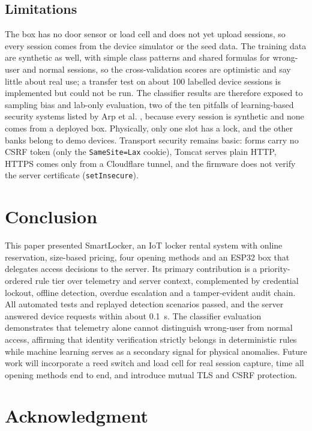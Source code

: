 \subsection{Limitations}
\label{sec:limits}

The box has no door sensor or load cell and does not yet upload sessions, so every session comes from the device
simulator or the seed data. The training data are synthetic as well, with simple class patterns and shared formulas
for wrong-user and normal sessions, so the cross-validation scores are optimistic and say little about real use; a
transfer test on about 100 labelled device sessions is implemented but could not be run. The classifier results are
therefore exposed to sampling bias and lab-only evaluation, two of the ten pitfalls of learning-based security systems
listed by Arp et al. \cite{arp2024pitfalls}, because every session is synthetic and none comes from a deployed box.
Physically, only one slot has
a lock, and the other banks belong to demo devices. Transport security remains basic: forms carry no CSRF token (only
the \texttt{SameSite=Lax} cookie), Tomcat serves plain HTTP, HTTPS comes only from a Cloudflare tunnel, and the
firmware does not verify the server certificate (\texttt{setInsecure}).

\section{Conclusion}


This paper presented SmartLocker, an IoT locker rental system with online reservation, size-based pricing, four opening methods and an ESP32 box that delegates access decisions to the server. Its primary contribution is a priority-ordered rule tier over telemetry and server context, complemented by credential lockout, offline detection, overdue escalation and a tamper-evident audit chain. All automated tests and replayed detection scenarios passed, and the server answered device requests within about 0.1~s. The classifier evaluation demonstrates that telemetry alone cannot distinguish wrong-user from normal access, affirming that identity verification strictly belongs in deterministic rules while machine learning serves as a secondary signal for physical anomalies. Future work will incorporate a reed switch and load cell for real session capture, time all opening methods end to end, and introduce mutual TLS and CSRF protection.



\section*{Acknowledgment}


